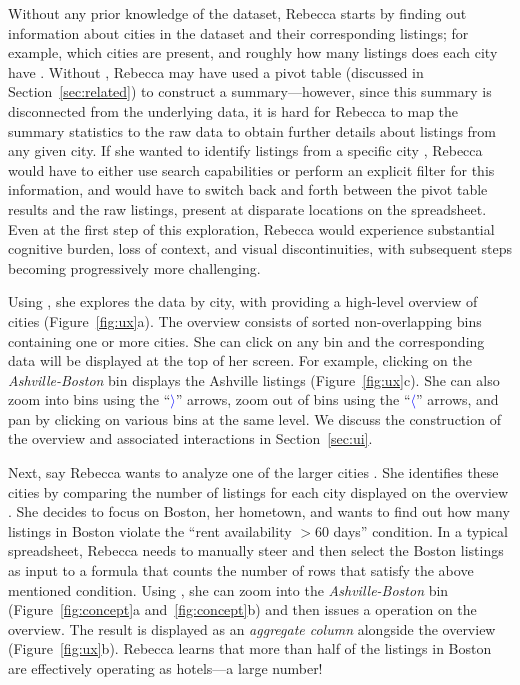 Without any prior knowledge of the dataset,
Rebecca starts by finding out information
about cities in the dataset and their corresponding listings;
for example, which cities are present,
and roughly how many listings does each city have .
Without \noah, Rebecca may have used
a pivot table (discussed in Section~\ref{sec:related})
to construct
a summary---however, since this summary is disconnected
from the underlying data, it is hard for Rebecca to
map the summary statistics to
the raw data to obtain further details
about listings from any given city.
If she wanted to identify listings from a specific city ,
Rebecca would have to either use search capabilities or
perform an explicit filter for this information,
and would have to switch back and forth between the
pivot table results and the raw listings,
present at disparate locations
on the spreadsheet.
Even at the first step of this exploration,
Rebecca would experience substantial cognitive burden,
loss of context,
and visual discontinuities,
with subsequent steps becoming progressively
more challenging.


Using \noah, she explores
the data by city,
with \noah providing a high-level overview of
cities (Figure~\ref{fig:ux}a).
The overview consists of sorted non-overlapping bins
containing one or more cities.
She can click on any bin and the corresponding
data will be displayed at the top of her screen.
For example, clicking on the {\em Ashville-Boston} bin
displays the Ashville listings (Figure~\ref{fig:ux}c).
She can also zoom into bins using the ``\textcolor{blue}{$\rangle$}'' arrows,
zoom out of bins using the ``\textcolor{blue}{$\langle$}'' arrows,
and pan by clicking on various bins at the same level.
We discuss the construction of the overview
and associated interactions in Section~\ref{sec:ui}.


Next, say Rebecca wants to analyze
one of the larger cities .
She identifies these cities by
comparing the number of listings
for each city displayed on the overview .
She decides to focus on Boston, her hometown,
and wants to find out how many listings
in Boston violate
the ``rent availability $>60$ days'' condition.
In a typical spreadsheet, Rebecca needs to manually steer and then select
the Boston listings as input to a  formula that counts the number of
rows that satisfy the above mentioned condition.
Using \noah, she can zoom into
the {\em Ashville-Boston} bin
(Figure~\ref{fig:concept}a and~\ref{fig:concept}b)
and then issues
a  operation on the overview.
The result is displayed as an {\em aggregate column}
alongside the overview (Figure~\ref{fig:ux}b).
Rebecca learns  that more than half of the listings in Boston are 
effectively operating as hotels---a large number! 

